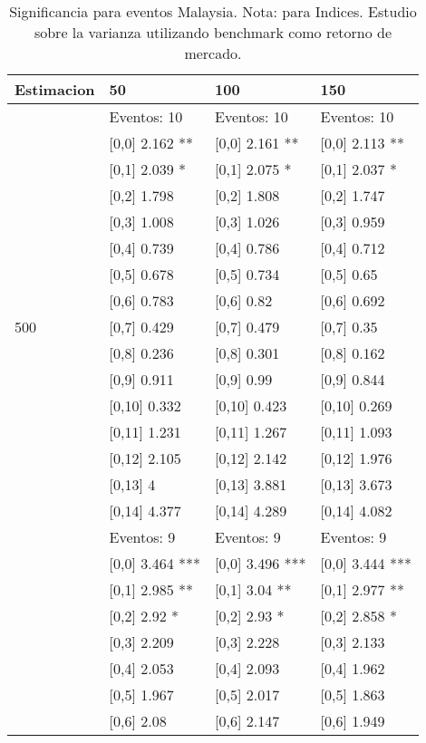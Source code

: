 \begin{table}

\caption{Significancia para eventos Malaysia. Nota: para Indices. Estudio sobre la varianza utilizando benchmark como retorno de mercado.}
\centering
\begin{tabular}[t]{llll}
\toprule
Estimacion & 50 & 100 & 150\\
\midrule
 & Eventos:  10 & Eventos:  10 & Eventos:  10\\
 & {}[0,0] 2.162 ** & {}[0,0] 2.161 ** & {}[0,0] 2.113 **\\
 & {}[0,1] 2.039 * & {}[0,1] 2.075 * & {}[0,1] 2.037 *\\
 & {}[0,2] 1.798 & {}[0,2] 1.808 & {}[0,2] 1.747\\
 & {}[0,3] 1.008 & {}[0,3] 1.026 & {}[0,3] 0.959\\
\addlinespace
 & {}[0,4] 0.739 & {}[0,4] 0.786 & {}[0,4] 0.712\\
 & {}[0,5] 0.678 & {}[0,5] 0.734 & {}[0,5] 0.65\\
 & {}[0,6] 0.783 & {}[0,6] 0.82 & {}[0,6] 0.692\\
500 & {}[0,7] 0.429 & {}[0,7] 0.479 & {}[0,7] 0.35\\
 & {}[0,8] 0.236 & {}[0,8] 0.301 & {}[0,8] 0.162\\
\addlinespace
 & {}[0,9] 0.911 & {}[0,9] 0.99 & {}[0,9] 0.844\\
 & {}[0,10] 0.332 & {}[0,10] 0.423 & {}[0,10] 0.269\\
 & {}[0,11] 1.231 & {}[0,11] 1.267 & {}[0,11] 1.093\\
 & {}[0,12] 2.105 & {}[0,12] 2.142 & {}[0,12] 1.976\\
 & {}[0,13] 4 & {}[0,13] 3.881 & {}[0,13] 3.673\\
\addlinespace
 & {}[0,14] 4.377 & {}[0,14] 4.289 & {}[0,14] 4.082\\
 & Eventos:  9 & Eventos:  9 & Eventos:  9\\
 & {}[0,0] 3.464 *** & {}[0,0] 3.496 *** & {}[0,0] 3.444 ***\\
 & {}[0,1] 2.985 ** & {}[0,1] 3.04 ** & {}[0,1] 2.977 **\\
 & {}[0,2] 2.92 * & {}[0,2] 2.93 * & {}[0,2] 2.858 *\\
\addlinespace
 & {}[0,3] 2.209 & {}[0,3] 2.228 & {}[0,3] 2.133\\
 & {}[0,4] 2.053 & {}[0,4] 2.093 & {}[0,4] 1.962\\
 & {}[0,5] 1.967 & {}[0,5] 2.017 & {}[0,5] 1.863\\
 & {}[0,6] 2.08 & {}[0,6] 2.147 & {}[0,6] 1.949\\

\end{tabular}
\end{table}
